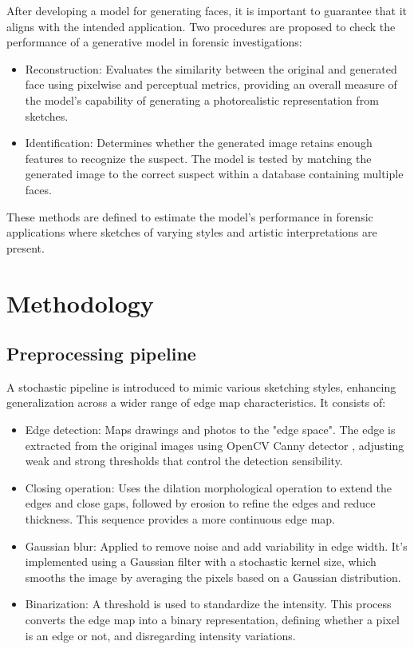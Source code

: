 \documentclass{IEEEcsmag}
\begin{document}
After developing a model for generating faces, it is important to guarantee that it aligns with the intended application. Two procedures are proposed to check the performance of a generative model in forensic investigations:

\begin{itemize} 
\item Reconstruction: Evaluates the similarity between the original and generated face using pixelwise and perceptual metrics, providing an overall measure of the model's capability of generating a photorealistic representation from sketches.
\item Identification: Determines whether the generated image retains enough features to recognize the suspect. The model is tested by matching the generated image to the correct suspect within a database containing multiple faces.
\end{itemize}

These methods are defined to estimate the model's performance in forensic applications where sketches of varying styles and artistic interpretations are present.

\section{Methodology}
\label{sec:methodology}

\smallskip

\subsection{Preprocessing pipeline}
\label{subsec:pipeline}

A stochastic pipeline is introduced to mimic various sketching styles, enhancing generalization across a wider range of edge map characteristics. It consists of:

\begin{itemize}
    \item Edge detection: Maps drawings and photos to the "edge space". The edge is extracted from the original images using OpenCV Canny detector \cite{canny1986}, adjusting weak and strong thresholds that control the detection sensibility.
    \item  Closing operation: Uses the dilation morphological operation to extend the edges and close gaps, followed by erosion to refine the edges and reduce thickness. This sequence provides a more continuous edge map.
    \item Gaussian blur: Applied to remove noise and add variability in edge width. It's implemented using a Gaussian filter with a stochastic kernel size, which smooths the image by averaging the pixels based on a Gaussian distribution.
    \item Binarization: A threshold is used to standardize the intensity. This process converts the edge map into a binary representation, defining whether a pixel is an edge or not, and disregarding intensity variations.
\end{itemize}
\end{document}
